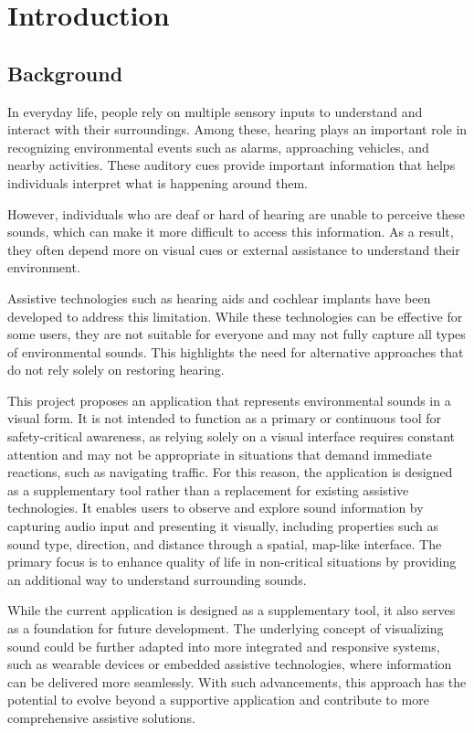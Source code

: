 \chapter{Introduction}
\label{chap:introduction}

\section{Background}
\label{section:background}

In everyday life, people rely on multiple sensory inputs to understand and interact with their surroundings. 
Among these, hearing plays an important role in recognizing environmental events such as alarms, 
approaching vehicles, and nearby activities. These auditory cues provide important information 
that helps individuals interpret what is happening around them.

However, individuals who are deaf or hard of hearing are unable to perceive these sounds, 
which can make it more difficult to access this information. As a result, 
they often depend more on visual cues or external assistance to understand their environment.

Assistive technologies such as hearing aids and cochlear implants have been developed to address this limitation. 
While these technologies can be effective for some users, 
they are not suitable for everyone and may not fully capture all types of environmental sounds. 
This highlights the need for alternative approaches that do not rely solely on restoring hearing.

This project proposes an application that represents environmental sounds in a visual form. 
It is not intended to function as a primary or continuous tool for safety-critical awareness, 
as relying solely on a visual interface requires constant attention and may not be appropriate in situations that demand immediate reactions, 
such as navigating traffic. For this reason, the application is designed as a supplementary tool rather than a replacement for existing assistive technologies. 
It enables users to observe and explore sound information by capturing audio input and presenting it visually, 
including properties such as sound type, direction, and distance through a spatial, map-like interface. 
The primary focus is to enhance quality of life in non-critical situations by providing an additional way to understand surrounding sounds.

While the current application is designed as a supplementary tool, it also serves as a foundation for future development. 
The underlying concept of visualizing sound could be further adapted into more integrated and responsive systems, 
such as wearable devices or embedded assistive technologies, where information can be delivered more seamlessly. 
With such advancements, this approach has the potential to evolve beyond a supportive application and contribute to more comprehensive assistive solutions.

